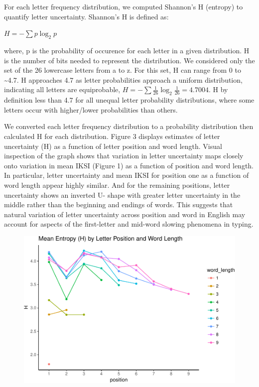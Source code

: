 \documentclass[floatsintext,man]{apa6}
\theoremstyle{definition}
\theoremstyle{definition}
\theoremstyle{definition}
\theoremstyle{remark}
\begin{document}
For each letter frequency distribution, we computed Shannon's H
(entropy) to quantify letter uncertainty. Shannon's H is defined as:

\(H = -\sum p \log_2 p\)

where, p is the probability of occurence for each letter in a given
distribution. H is the number of bits needed to represent the
distribution. We considered only the set of the 26 lowercase letters
from a to z. For this set, H can range from 0 to \textasciitilde{}4.7. H
approaches 4.7 as letter probabilities approach a uniform distribution,
indicating all letters are equiprobable,
\(H = -\sum \frac{1}{26} \log_2 \frac{1}{26} = 4.7004\). H by definition
less than 4.7 for all unequal letter probability distributions, where
some letters occur with higher/lower probabilities than others.

We converted each letter frequency distribution to a probability
distribution then calculated H for each distribution. Figure 3 displays
estimates of letter uncertainty (H) as a function of letter position and
word length. Visual inspection of the graph shows that variation in
letter uncertainty maps closely onto variation in mean IKSI (Figure 1)
as a function of position and word length. In particular, letter
uncertainty and mean IKSI for position one as a function of word length
appear highly similar. And for the remaining positions, letter
uncertainty shows an inverted U- shape with greater letter uncertainty
in the middle rather than the beginning and endings of words. This
suggests that natural variation of letter uncertainty across position
and word in English may account for aspects of the first-letter and
mid-word slowing phenomena in typing.

\begin{figure}[htbp]
\centering
\includegraphics{Entropy_typing_draft_files/figure-latex/letter_uncertainty-1.pdf}
\caption{}
\end{figure}
\end{document}
